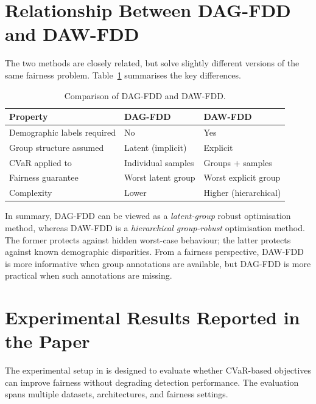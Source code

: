 \section{Relationship Between DAG-FDD and DAW-FDD}
\label{sec:dag_vs_daw}

The two methods are closely related, but solve slightly different versions of the same fairness problem. Table~\ref{tab:dag_vs_daw} summarises the key differences.

\begin{table}[htbp]
\centering
\caption{Comparison of DAG-FDD and DAW-FDD.}
\label{tab:dag_vs_daw}
\begin{tabular}{@{}lll@{}}
\toprule
\textbf{Property} & \textbf{DAG-FDD} & \textbf{DAW-FDD} \\
\midrule
Demographic labels required & No  & Yes \\
Group structure assumed     & Latent (implicit) & Explicit \\
CVaR applied to             & Individual samples & Groups + samples \\
Fairness guarantee          & Worst latent group & Worst explicit group \\
Complexity                  & Lower & Higher (hierarchical) \\
\bottomrule
\end{tabular}
\end{table}

\noindent In summary, DAG-FDD can be viewed as a \emph{latent-group} robust optimisation method, whereas DAW-FDD is a \emph{hierarchical group-robust} optimisation method. The former protects against hidden worst-case behaviour; the latter protects against known demographic disparities. From a fairness perspective, DAW-FDD is more informative when group annotations are available, but DAG-FDD is more practical when such annotations are missing.

\section{Experimental Results Reported in the Paper}
\label{sec:ch4_experiments}

The experimental setup in \cite{dag_paper} is designed to evaluate whether CVaR-based objectives can improve fairness without degrading detection performance. The evaluation spans multiple datasets, architectures, and fairness settings.


